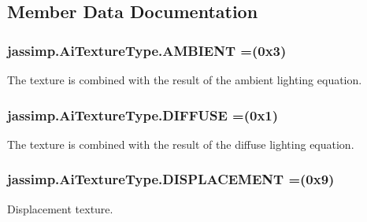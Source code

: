 \subsection{Member Data Documentation}
\hypertarget{enumjassimp_1_1_ai_texture_type_aa58207925555076484eebefd7c45e545}{
\subsubsection[{A\+M\+B\+I\+E\+N\+T}]{\setlength{\rightskip}{0pt plus 5cm}jassimp.\+Ai\+Texture\+Type.\+A\+M\+B\+I\+E\+N\+T =(0x3)}}\label{enumjassimp_1_1_ai_texture_type_aa58207925555076484eebefd7c45e545}
The texture is combined with the result of the ambient lighting equation. \hypertarget{enumjassimp_1_1_ai_texture_type_ac975561d02071a3313c9ce899e4c717f}{
\subsubsection[{D\+I\+F\+F\+U\+S\+E}]{\setlength{\rightskip}{0pt plus 5cm}jassimp.\+Ai\+Texture\+Type.\+D\+I\+F\+F\+U\+S\+E =(0x1)}}\label{enumjassimp_1_1_ai_texture_type_ac975561d02071a3313c9ce899e4c717f}
The texture is combined with the result of the diffuse lighting equation. \hypertarget{enumjassimp_1_1_ai_texture_type_a7aa2913d5247b5ef2215738a7c64b82a}{
\subsubsection[{D\+I\+S\+P\+L\+A\+C\+E\+M\+E\+N\+T}]{\setlength{\rightskip}{0pt plus 5cm}jassimp.\+Ai\+Texture\+Type.\+D\+I\+S\+P\+L\+A\+C\+E\+M\+E\+N\+T =(0x9)}}\label{enumjassimp_1_1_ai_texture_type_a7aa2913d5247b5ef2215738a7c64b82a}
Displacement texture.

